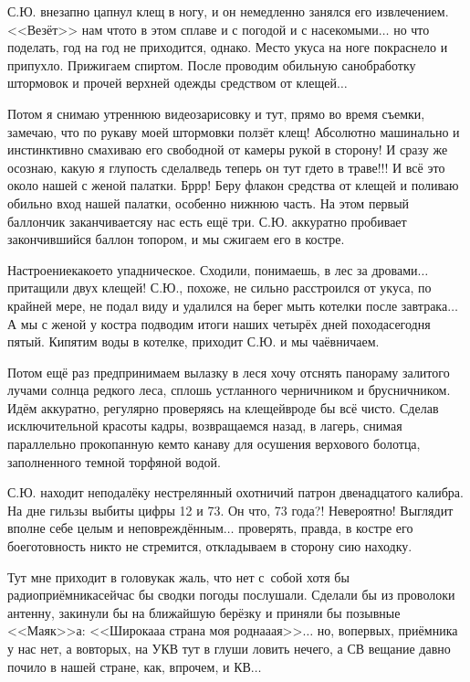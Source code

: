 С.Ю. внезапно цапнул клещ в ногу, и он немедленно занялся его извлечением. <<Везёт>> нам что\sdash то в этом сплаве и с погодой и с насекомыми$\ldots$ но что поделать, год на год не приходится, однако. Место укуса на ноге покраснело и припухло. Прижигаем спиртом. После проводим обильную санобработку штормовок и прочей верхней одежды средством от клещей$\ldots$
 
Потом я снимаю утреннюю видеозарисовку и тут, прямо во время съемки, замечаю, что по рукаву моей штормовки ползёт клещ! Абсолютно машинально и инстинктивно смахиваю его свободной от камеры рукой в сторону! И сразу же осознаю, какую я глупость сделал\mdash ведь теперь он тут где\sdash то в траве!!! И всё это около нашей с женой палатки. Бр\sdash р\sdash р! Беру флакон средства от клещей и поливаю обильно вход нашей палатки, особенно нижнюю часть. На этом первый баллончик заканчивается\mdash у нас есть ещё три. С.Ю. аккуратно пробивает закончившийся баллон топором, и мы сжигаем его в костре. 

Настроение\mdash какое\sdash то упадническое. Сходили, понимаешь, в лес за дровами$\ldots$ притащили двух клещей! С.Ю., похоже, не сильно расстроился от укуса, по крайней мере, не подал виду и удалился на берег мыть котелки после завтрака$\ldots$ А мы с женой у костра подводим итоги наших четырёх дней похода\mdash сегодня пятый. Кипятим воды в котелке, приходит С.Ю. и мы чаёвничаем.

Потом ещё раз предпринимаем вылазку в лес\mdash я хочу отснять панораму залитого лучами солнца редкого леса, сплошь устланного черничником и брусничником. Идём аккуратно, регулярно проверяясь на клещей\mdash вроде бы всё чисто. Сделав исключительной красоты кадры, возвращаемся назад, в лагерь, снимая параллельно прокопанную кем\sdash то канаву для осушения верхового болотца, заполненного темной торфяной водой.

С.Ю. находит неподалёку нестрелянный охотничий патрон двенадцатого калибра. На дне гильзы выбиты цифры 12 и 73. Он что, 73 года?! Невероятно! Выглядит вполне себе целым и неповреждённым$\ldots$ проверять, правда, в костре его боеготовность никто не стремится, откладываем в сторону сию находку. 

Тут мне приходит в голову\mdash как жаль, что нет с~собой хотя бы радиоприёмника\mdash сейчас бы сводки погоды послушали. Сделали бы из проволоки антенну, закинули бы на ближайшую берёзку и приняли бы позывные <<Маяк>>\sdash а: <<Широка\sdash а\sdash а страна моя родна\sdash а\sdash ая>>$\ldots$ но, во\sdash первых, приёмника у нас нет, а во\sdash вторых, на УКВ тут в глуши ловить нечего, а СВ вещание давно почило в нашей стране, как, впрочем, и КВ$\ldots$

